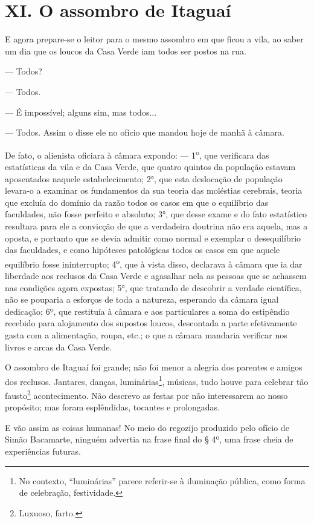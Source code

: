 \chapter{XI. O assombro de Itaguaí}

E agora prepare-se o leitor para o mesmo assombro em que ficou a vila,
ao saber um dia que os loucos da Casa Verde iam todos ser postos na rua.

--- Todos?

--- Todos.

--- É impossível; alguns sim, mas todos...

--- Todos. Assim o disse ele no ofício que mandou hoje de manhã à
câmara.

De fato, o alienista oficiara à câmara expondo: ---
1\textsuperscript{o}, que verificara das estatísticas da vila e da Casa
Verde, que quatro quintos da população estavam aposentados naquele
estabelecimento; 2°, que esta deslocação de população levara-o a
examinar os fundamentos da sua teoria das moléstias cerebrais, teoria
que excluía do domínio da razão todos os casos em que o equilíbrio das
faculdades, não fosse perfeito e absoluto; 3°, que desse exame e do fato
estatístico resultara para ele a convicção de que a verdadeira doutrina
não era aquela, mas a oposta, e portanto que se devia admitir como
normal e exemplar o desequilíbrio das faculdades, e como hipóteses
patológicas todos os casos em que aquele equilíbrio fosse ininterrupto;
4\textsuperscript{o}, que à vista disso, declarava à câmara que ia dar
liberdade aos reclusos da Casa Verde e agasalhar nela as pessoas que se
achassem nas condições agora expostas; 5°, que tratando de descobrir a
verdade científica, não se pouparia a esforços de toda a natureza,
esperando da câmara igual dedicação; 6º, que restituía à câmara e aos
particulares a soma do estipêndio recebido para alojamento dos supostos
loucos, descontada a parte efetivamente gasta com a alimentação, roupa,
etc.; o que a câmara mandaria verificar nos livros e arcas da Casa
Verde.

O assombro de Itaguaí foi grande; não foi menor a alegria dos parentes e
amigos dos reclusos. Jantares, danças, luminárias\footnote{No contexto,
  ``luminárias'' parece referir-se à iluminação pública, como forma de
  celebração, festividade.}, músicas, tudo houve para celebrar tão
fausto\footnote{Luxuoso, farto.} acontecimento. Não descrevo as festas
por não interessarem ao nosso propósito; mas foram esplêndidas, tocantes
e prolongadas.

E vão assim as coisas humanas! No meio do regozijo produzido pelo ofício
de Simão Bacamarte, ninguém advertia na frase final do § 4º, uma frase
cheia de experiências futuras.

